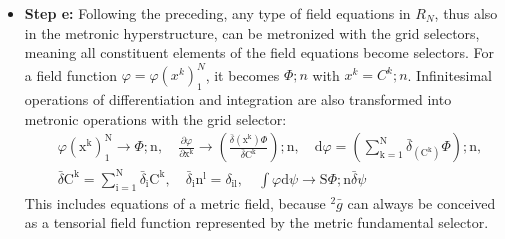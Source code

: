 \documentclass[12pt]{article}
\begin{document}
\begin{itemize}
\begin{itemize}
        \begin{equation}
        \mathrm{F_i};\mathrm{n} = \underset{\tau}{\overset{\mathrm{n_i}}{\mathrm{S}}} \int_{\Omega_\mathrm{i}} \prod_{\mathrm{l}=1}^\mathrm{p} \mathrm{d}\xi^\mathrm{l}_{(\mathrm{i})} \bar{\delta}\gamma, \quad 1 \le \mathrm{i} \le \mathrm{L} \ge \mathrm{N}, \quad \tau \mathrm{c_i} \left( (\ )^\mathrm{l}_{(\mathrm{i})} \right)_1^\mathrm{p} = \mathrm{F_i}(\mathrm{C_k})_1^\mathrm{N} \tag{88}
        \end{equation}
        which completes the metronization of the \( R_N \), expressing all selectors determining the hyperstructure explicitly by the grid selectors \( C_k \), containing all properties of the selective semantic iterator.
        \item \textbf{Step e:} Following the preceding, any type of field equations in \( R_N \), thus also in the metronic hyperstructure, can be metronized with the grid selectors, meaning all constituent elements of the field equations become selectors. For a field function \( \varphi = \varphi(x^k)_1^N \), it becomes \( \Phi ; n \) with \( x^k = C^k ; n \). Infinitesimal operations of differentiation and integration are also transformed into metronic operations with the grid selector:
        \begin{equation}
        \begin{aligned}
        & \varphi(\mathrm{x^k})_1^\mathrm{N} \to \Phi;\mathrm{n}, \quad \frac{\partial \varphi}{\partial \mathrm{x^k}} \to \left( \frac{\bar{\delta}(\mathrm{x^k})\Phi}{\bar{\delta}\mathrm{C^k}} \right);\mathrm{n}, \quad \mathrm{d}\varphi = \left( \sum_{\mathrm{k}=1}^\mathrm{N} \bar{\delta}_{(\mathrm{C^k})} \Phi \right);\mathrm{n}, \\
        & \bar{\delta}\mathrm{C^k} = \sum_{\mathrm{i}=1}^\mathrm{N} \bar{\delta}_\mathrm{i} \mathrm{C^k}, \quad \bar{\delta}_\mathrm{i}\mathrm{n^l} = \delta_{\mathrm{il}}, \quad \int \varphi \mathrm{d}\psi \to \mathrm{S}\Phi;\mathrm{n}\bar{\delta}\psi
        \end{aligned} \tag{88a}
        \end{equation}
        This includes equations of a metric field, because \( {}^2\bar{g} \) can always be conceived as a tensorial field function represented by the metric fundamental selector.
    \end{itemize}


\end{itemize}
\end{document}
